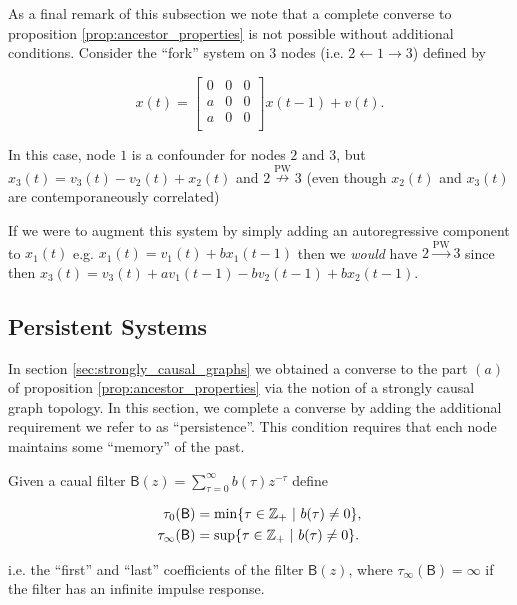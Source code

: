 \documentclass[12pt]{article}
\def\pwgc{\overset{\text{PW}}{\rightarrow}}  %
\def\npwgc{\overset{\text{PW}}{\nrightarrow}}  %
\def\B{\mathsf{B}}  %
\begin{document}
\begin{example}
  As a final remark of this subsection we note that a complete
  converse to proposition \ref{prop:ancestor_properties} is not
  possible without additional conditions.  Consider the ``fork'' system on $3$
  nodes (i.e. $2 \leftarrow 1 \rightarrow 3$) defined by

  \begin{equation*}
    x(t) =
    \left[
      \begin{array}{cccc}
        0 & 0 & 0\\
        a & 0 & 0\\
        a & 0 & 0\\
      \end{array}
    \right] x(t - 1) + v(t).
  \end{equation*}

  In this case, node $1$ is a confounder for nodes $2$ and $3$, but
  $x_3(t) = v_3(t) - v_2(t) + x_2(t)$ and $2 \npwgc 3$ (even
  though $x_2(t)$ and $x_3(t)$ are contemporaneously correlated)

  If we were to augment this system by simply adding an autoregressive
  component to $x_1(t)$ e.g.  $x_1(t) = v_1(t) + b x_1(t - 1)$ then we
  \textit{would} have $2 \pwgc 3$ since then
  $x_3(t) = v_3(t) + av_1(t - 1) - bv_2(t - 1) + bx_2(t - 1)$.
\end{example}

\subsection{Persistent Systems}
\label{sec:persistent_systems}
In section \ref{sec:strongly_causal_graphs} we obtained a converse to
the part $(a)$ of proposition \ref{prop:ancestor_properties} via the
notion of a strongly causal graph topology.  In this section, we
complete a converse by adding the additional requirement we refer to
as ``persistence''.  This condition requires that each node maintains
some ``memory'' of the past.

\begin{definition}
  Given a caual filter $\B(z) = \sum_{\tau = 0}^\infty b(\tau)z^{-\tau}$
  define 

  \begin{align}
    \tau_0(\B) &= \text{min}\{\tau \in \Z_+\ |\ b(\tau) \ne 0\},\\
    \tau_{\infty}(\B) &= \text{sup}\{\tau \in \Z_+\ |\ b(\tau) \ne 0\}.\\
  \end{align}

  i.e. the ``first'' and ``last'' coefficients of the filter $\B(z)$,
  where $\tau_\infty(\B) = \infty$ if the filter has an infinite
  impulse response.
\end{definition}
\end{document}
